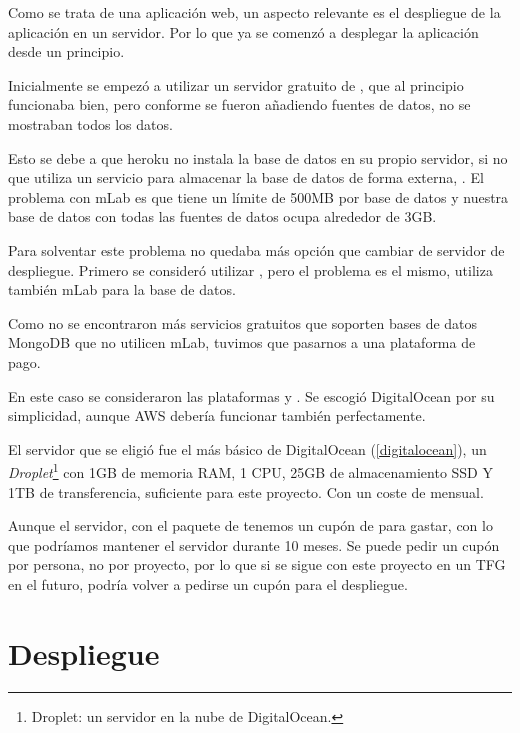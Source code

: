 Como se trata de una aplicación web, un aspecto relevante es el despliegue de la aplicación en un servidor. Por lo que ya se comenzó a desplegar la aplicación desde un principio.

Inicialmente se empezó a utilizar un servidor gratuito de , que al principio funcionaba bien, pero conforme se fueron añadiendo fuentes de datos, no se mostraban todos los datos.

Esto se debe a que heroku no instala la base de datos en su propio servidor, si no que utiliza un servicio para almacenar la base de datos de forma externa, . El problema con mLab es que tiene un límite de 500MB por base de datos y nuestra base de datos con todas las fuentes de datos ocupa alrededor de 3GB.

Para solventar este problema no quedaba más opción que cambiar de servidor de despliegue. Primero se consideró utilizar , pero el problema es el mismo, utiliza también mLab para la base de datos.

Como no se encontraron más servicios gratuitos que soporten bases de datos MongoDB que no utilicen mLab, tuvimos que pasarnos a una plataforma de pago.

En este caso se consideraron las plataformas  y . Se escogió DigitalOcean por su simplicidad, aunque AWS debería funcionar también perfectamente.

El servidor que se eligió fue el más básico de DigitalOcean (\ref{digitalocean}), un \textit{Droplet}\footnote{Droplet: un servidor en la nube de DigitalOcean.} con 1GB de memoria RAM, 1 CPU, 25GB de almacenamiento SSD Y 1TB de transferencia, suficiente para este proyecto. Con un coste de  mensual.

Aunque el servidor, con el paquete de  tenemos un cupón de  para gastar, con lo que podríamos mantener el servidor durante 10 meses. Se puede pedir un cupón por persona, no por proyecto, por lo que si se sigue con este proyecto en un TFG en el futuro, podría volver a pedirse un cupón para el despliegue.

\section{Despliegue}

